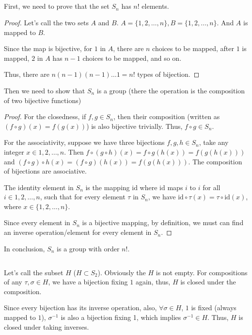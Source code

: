 \documentclass[12pt]{article}
\begin{document}
\subsection{} %
First, we need to prove that the set $S_n$ has $n!$ elements.
\begin{proof}
Let's call the two sets $A$ and $B$. $A=\{1,2,\dots,n\},B=\{1,2,\dots,n\}$. And $A$ is mapped to $B$.

Since the map is bijective, for $1$ in $A$, there are $n$ choices to be mapped, after $1$ is mapped, $2$ in $A$ has $n-1$ choices to be mapped, and so on.

Thus, there are $n(n-1)(n-1)\dots1=n!$ types of bijection.
\end{proof}
Then we need to show that $S_n$ is a group (there the operation is the composition of two bijective functions)
\begin{proof}
For the closedness, if $f,g\in S_n$, then their composition (written as $(f\circ g)(x)=f(g(x))$) is also bijective trivially. Thus, $f\circ g\in S_n$.

For the associativity, suppose we have three bijections $f,g,h\in S_n$, take any integer $x\in{1,2,\dots,n}$. Then $f\circ (g\circ h)(x)=f\circ g(h(x))=f(g(h(x)))$ and $(f\circ g)\circ h(x)=(f\circ g)(h(x))=f(g(h(x)))$. The composition of bijections are associative.

The identity element in $S_n$ is the mapping $\mathrm{id}$ where $\mathrm{id}$ maps $i$ to $i$ for all $i\in{1,2,\dots,n}$, such that for every element $\tau$ in $S_n$, we have $\mathrm{id}\circ\tau(x)=\tau\circ\mathrm{id}(x)$, where $x\in\{1,2,\dots,n\}$.

Since every element in $S_n$ is a bijective mapping, by definition, we must can find an inverse operation/element for every element in $S_n$.
\end{proof}
In conclusion, $S_n$ is a group with order $n!$.
\subsection{} %
Let's call the subset $H$ ($H\subset S_2$). Obviously the $H$ is not empty. For compositions of any $\tau,\sigma\in H$, we have a bijection fixing $1$ again, thus, $H$ is closed under the composition.

Since every bijection has its inverse operation, also, $\forall \sigma\in H$, $1$ is fixed (always mapped to $1$), $\sigma^{-1}$ is also a bijection fixing 1, which implies $\sigma^{-1}\in H$. Thus, $H$ is closed under taking inverses.
\end{document}
